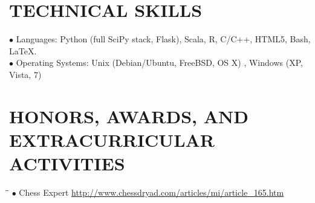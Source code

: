 \documentclass{resume}
\begin{document}
\begin{resume}
\section{TECHNICAL SKILLS}
\vspace{-0.05mm}
\begin{tabbing}
$\bullet$ Languages: Python (full SciPy stack, Flask), Scala,  R, C/C++,
HTML5, Bash, \LaTeX{}.
\\
$\bullet$ Operating Systems: Unix (Debian/Ubuntu, FreeBSD, OS X) , Windows (XP, Vista, 7) 
\end{tabbing}

\section{HONORS, AWARDS, AND EXTRACURRICULAR ACTIVITIES} 
\vspace{-0.05mm}
\begin{tabbing}
\hspace{2.3in}\= \hspace{2.6in}\= \kill
$\bullet$ Chess Expert \url{http://www.chessdryad.com/articles/mi/article_165.htm}
\end{tabbing}
\end{resume}
%
\end{document}
